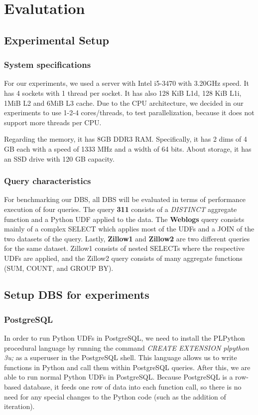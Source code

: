 \section{Evalutation}
\label{sec:experiments}

\subsection{Experimental Setup}
\subsubsection{System specifications}
\label{subsec:systemspecs}
For our experiments, we used a server with Intel i5-3470 with 3.20GHz speed. It has 4 sockets with 1 thread per socket. 
It has also 128 KiB L1d, 128 KiB L1i, 1MiB L2 and 6MiB L3 cache. Due to the CPU architecture, 
we decided in our experiments to use 1-2-4 cores/threads, 
to test parallelization, because it does not support more threads per CPU.

Regarding the memory, it has 8GB DDR3 RAM. Specifically, it has 2 dims of 4 GB each with a speed of 1333 MHz and a width of 64 bits. 
About storage, it has an SSD drive with 120 GB capacity.

\subsubsection{Query characteristics}
For benchmarking our DBS, all DBS will be evaluated in terms of performance execution of 
four queries. 
The query \textbf{311} consists of a \emph{DISTINCT} aggregate function and a 
Python UDF applied to the data. The \textbf{Weblogs} query consists mainly of a complex SELECT which 
applies most of the UDFs and a JOIN of the two datasets of the query. 
Lastly, \textbf{Zillow1} and \textbf{Zillow2} are two different queries for the same dataset. 
Zillow1 consists of nested SELECTs where the respective UDFs are applied,
and the Zillow2 query consists of many aggregate 
functions (SUM, COUNT, and GROUP BY).

\subsection{Setup DBS for experiments}
\subsubsection{PostgreSQL}
In order to run Python UDFs in PostgreSQL, we need to install the PL\/Python 
procedural language by running the command \emph{CREATE EXTENSION plpython
3u;} as a superuser in the PostgreSQL shell. 
This language allows us to write functions in Python and call them within
PostgreSQL queries. After this, we are able to run normal Python UDFs in
PostgreSQL. 
Because PostgreSQL is a row-based database, it feeds one row of data into 
each function call, so there is no need for any special changes to the 
Python code (such as the addition of iteration).

